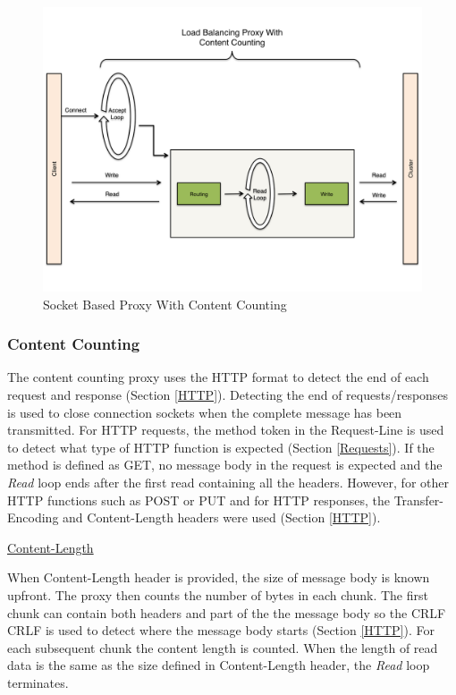 \documentclass[a4paper,11pt,twoside]{report}
\begin{document}
\begin{figure}[!ht]
  \centering
     \includegraphics[scale=0.31]{content_counting_proxy}
  \caption{Socket Based Proxy With Content Counting}
  \label{content_counting_proxy}
\end{figure}

\subsubsection*{Content Counting}
The content counting proxy uses the HTTP format to detect the end of each request and response (Section \ref{HTTP}). Detecting the end of requests/responses is used to close connection sockets when the complete message has been transmitted.   For HTTP requests, the method token in the Request-Line is used to detect what type of HTTP function is expected (Section \ref{Requests}). If the method is defined as GET, no message body in the request is expected and the \textit{Read} loop ends after the first read containing all the headers. However, for other HTTP functions such as POST or PUT and for HTTP responses, the Transfer-Encoding and Content-Length headers were used (Section \ref{HTTP}).\medskip 

\noindent
\underline{Content-Length}\medskip

\noindent
When Content-Length header is provided, the size of message body is known upfront.  The proxy then counts the number of bytes in each chunk.  The first chunk can contain both headers and part of the the message body so the CRLF CRLF is used to detect where the message body starts (Section \ref{HTTP}). For each subsequent chunk the content length is counted. When the length of read data is the same as the size defined in Content-Length header, the \textit{Read} loop terminates.\medskip 
\end{document}
